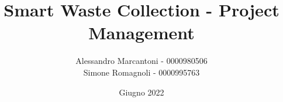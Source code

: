 \title{Smart Waste Collection - Project Management}
\author{Alessandro Marcantoni - 0000980506\\
Simone Romagnoli - 0000995763}
\date{Giugno 2022}